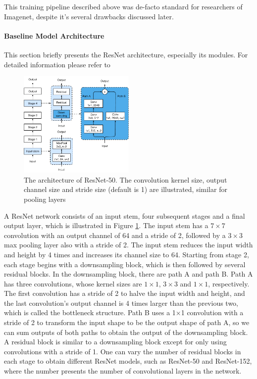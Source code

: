 This training pipeline described above was de-facto standard for researchers of Imagenet, despite it's several drawbacks discussed later. 

\paragraph{Baseline Model Architecture}
This section briefly presents the ResNet architecture, especially its modules. For detailed information please refer to \cite{he2016deep_resnetv1}


\begin{figure}[h!]
    \caption{The architecture of ResNet-50. The convolution kernel size, output channel size and stride size (default is 1) are illustrated, similar for pooling layers}
    \label{fig: resnet-a}
    \includegraphics[width=0.5\textwidth]{images/resnet-a.pdf}
  \end{figure}


A ResNet network consists of an input stem, four subsequent stages and a final output layer, which is illustrated in Figure \ref{fig: resnet-a}. The input stem has a $7 \times 7$ convolution with an output channel of 64 and a stride of 2, followed by a $3 \times 3$ max pooling layer also with a stride of 2. The input stem reduces the input width and height by 4 times and increases its channel size to 64. 
Starting from stage 2, each stage begins with a downsampling block, which is then followed by several residual blocks. In the downsampling block, there are path A and path B. Path A has three convolutions, whose kernel sizes are $1 \times 1$, $3 \times 3$ and $1 \times 1$, respectively. The first convolution has a stride of 2 to halve the input width and height, and the last convolution’s output channel is 4 times larger than the previous two, which is called the bottleneck structure. Path B uses a 1×1 convolution with a stride of 2 to transform the input shape to be the output shape of path A, so we can sum outputs of both paths to obtain the output of the downsampling block. A residual block is similar to a downsampling block except for only using convolutions with a stride of 1.
One can vary the number of residual blocks in each stage to obtain different ResNet models, such as ResNet-50 and ResNet-152, where the number presents the number of convolutional layers in the network.


